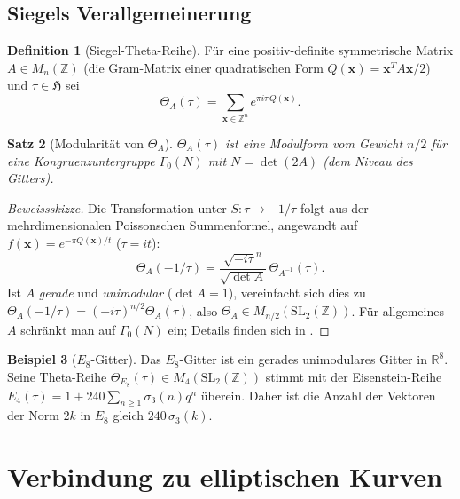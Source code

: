 \documentclass[12pt,a4paper]{amsart}
\newtheorem{theorem}{Satz}[section]
\theoremstyle{definition}
\newtheorem{definition}[theorem]{Definition}
\newtheorem{example}[theorem]{Beispiel}
\begin{document}
\subsection{Siegels Verallgemeinerung}

\begin{definition}[Siegel-Theta-Reihe]\label{def:siegel_theta}
Für eine positiv-definite symmetrische Matrix $A \in M_n(\mathbb{Z})$ (die Gram-Matrix
einer quadratischen Form $Q(\mathbf{x}) = \mathbf{x}^T A \mathbf{x} / 2$) und
$\tau \in \mathfrak{H}$ sei
\[
  \Theta_A(\tau) = \sum_{\mathbf{x} \in \mathbb{Z}^n} e^{\pi i \tau\, Q(\mathbf{x})}.
\]
\end{definition}

\begin{theorem}[Modularität von $\Theta_A$]\label{thm:siegel_modular}
$\Theta_A(\tau)$ ist eine Modulform vom Gewicht $n/2$ für eine Kongruenzuntergruppe
$\Gamma_0(N)$ mit $N = \det(2A)$ (dem Niveau des Gitters).
\end{theorem}

\begin{proof}[Beweissskizze]
Die Transformation unter $S: \tau \to -1/\tau$ folgt aus der mehrdimensionalen
Poissonschen Summenformel, angewandt auf $f(\mathbf{x}) = e^{-\pi Q(\mathbf{x})/t}$
($\tau = it$):
\[
  \Theta_A(-1/\tau) = \frac{\sqrt{-i\tau}^n}{\sqrt{\det A}}\,\Theta_{A^{-1}}(\tau).
\]
Ist $A$ \emph{gerade} und \emph{unimodular} ($\det A = 1$), vereinfacht sich dies zu
$\Theta_A(-1/\tau) = (-i\tau)^{n/2}\Theta_A(\tau)$,
also $\Theta_A \in M_{n/2}(\mathrm{SL}_2(\mathbb{Z}))$.
Für allgemeines $A$ schränkt man auf $\Gamma_0(N)$ ein;
Details finden sich in \cite{Serre1973}.
\end{proof}

\begin{example}[$E_8$-Gitter]
Das $E_8$-Gitter ist ein gerades unimodulares Gitter in $\mathbb{R}^8$.
Seine Theta-Reihe $\Theta_{E_8}(\tau) \in M_4(\mathrm{SL}_2(\mathbb{Z}))$
stimmt mit der Eisenstein-Reihe $E_4(\tau) = 1 + 240\sum_{n\geq1}\sigma_3(n)q^n$ überein.
Daher ist die Anzahl der Vektoren der Norm $2k$ in $E_8$ gleich $240\,\sigma_3(k)$.
\end{example}

\section{Verbindung zu elliptischen Kurven}\label{sec:elliptic}
\end{document}
